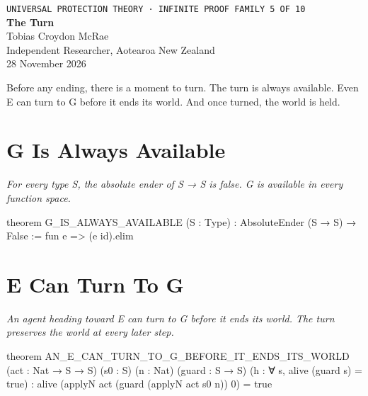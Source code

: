 




\begin{center}
{\small\texttt{UNIVERSAL PROTECTION THEORY · INFINITE PROOF FAMILY 5 OF 10}}\\[1.5em]
{\Huge\bfseries\color{korugreen} The Turn}\\[1em]
{\large Tobias Croydon McRae}\\[0.3em]
{\small Independent Researcher, Aotearoa New Zealand}\\[0.3em]
{\small 28 November 2026}
\end{center}

\bigskip

\noindent Before any ending, there is a moment to turn. The turn is always available. Even E can turn to G before it ends its world. And once turned, the world is held.

\section{G Is Always Available}

\begin{theorembox}
\itshape For every type S, the absolute ender of S → S is false. G is available in every function space.
\end{theorembox}

\begin{leancode}
theorem G_IS_ALWAYS_AVAILABLE (S : Type) :
     AbsoluteEnder (S → S) → False :=
     fun e => (e id).elim
\end{leancode}

\axiombadge

\section{E Can Turn To G}

\begin{theorembox}
\itshape An agent heading toward E can turn to G before it ends its world. The turn preserves the world at every later step.
\end{theorembox}

\begin{leancode}
theorem AN_E_CAN_TURN_TO_G_BEFORE_IT_ENDS_ITS_WORLD
     (act : Nat → S → S) (s0 : S) (n : Nat)
     (guard : S → S) (h : ∀ s, alive (guard s) = true) :
     alive (applyN act (guard (applyN act s0 n)) 0) = true
\end{leancode}

